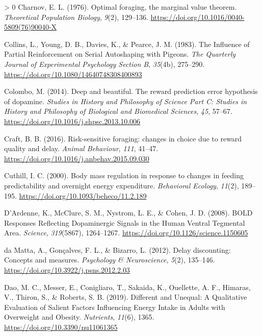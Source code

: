 \documentclass[
]{/home/nicoluarte/Downloads/templates/PNAS-template-main.tex}
\newlength{\cslhangindent}
\newenvironment{CSLReferences}[3] %
 {%
  \setlength{\parindent}{0pt}
  \ifodd #1 \everypar{\setlength{\hangindent}{\cslhangindent}}\ignorespaces\fi
  \ifnum #2 > 0
  \setlength{\parskip}{#2\baselineskip}
  \fi
 }%
 {}
\begin{document}
\begin{CSLReferences}{1}{0}
\leavevmode\hypertarget{ref-ESYGCSLH}{}%
Charnov, E. L. (1976). Optimal foraging, the marginal value theorem.
\emph{Theoretical Population Biology}, \emph{9}(2), 129--136.
\url{https://doi.org/10.1016/0040-5809(76)90040-X}

\leavevmode\hypertarget{ref-P3MLPUGY}{}%
Collins, L., Young, D. B., Davies, K., \& Pearce, J. M. (1983). The
Influence of Partial Reinforcement on Serial Autoshaping with Pigeons.
\emph{The Quarterly Journal of Experimental Psychology Section B},
\emph{35}(4b), 275--290. \url{https://doi.org/10.1080/14640748308400893}

\leavevmode\hypertarget{ref-6ZEIWIGL}{}%
Colombo, M. (2014). Deep and beautiful. The reward prediction error
hypothesis of dopamine. \emph{Studies in History and Philosophy of
Science Part C: Studies in History and Philosophy of Biological and
Biomedical Sciences}, \emph{45}, 57--67.
\url{https://doi.org/10.1016/j.shpsc.2013.10.006}

\leavevmode\hypertarget{ref-YI6J6Y7I}{}%
Craft, B. B. (2016). Risk-sensitive foraging: changes in choice due to
reward quality and delay. \emph{Animal Behaviour}, \emph{111}, 41--47.
\url{https://doi.org/10.1016/j.anbehav.2015.09.030}

\leavevmode\hypertarget{ref-3GQMEPEH}{}%
Cuthill, I. C. (2000). Body mass regulation in response to changes in
feeding predictability and overnight energy expenditure.
\emph{Behavioral Ecology}, \emph{11}(2), 189--195.
\url{https://doi.org/10.1093/beheco/11.2.189}

\leavevmode\hypertarget{ref-8TKQDEML}{}%
D'Ardenne, K., McClure, S. M., Nystrom, L. E., \& Cohen, J. D. (2008).
BOLD Responses Reflecting Dopaminergic Signals in the Human Ventral
Tegmental Area. \emph{Science}, \emph{319}(5867), 1264--1267.
\url{https://doi.org/10.1126/science.1150605}

\leavevmode\hypertarget{ref-9YRMQU6H}{}%
da Matta, A., Gonçalves, F. L., \& Bizarro, L. (2012). Delay
discounting: Concepts and measures. \emph{Psychology \& Neuroscience},
\emph{5}(2), 135--146. \url{https://doi.org/10.3922/j.psns.2012.2.03}

\leavevmode\hypertarget{ref-D6LH64XI}{}%
Dao, M. C., Messer, E., Conigliaro, T., Sakaida, K., Ouellette, A. F.,
Himaras, V., Thiron, S., \& Roberts, S. B. (2019). Different and
Unequal: A Qualitative Evaluation of Salient Factors Influencing Energy
Intake in Adults with Overweight and Obesity. \emph{Nutrients},
\emph{11}(6), 1365. \url{https://doi.org/10.3390/nu11061365}


\end{CSLReferences}
\end{document}
